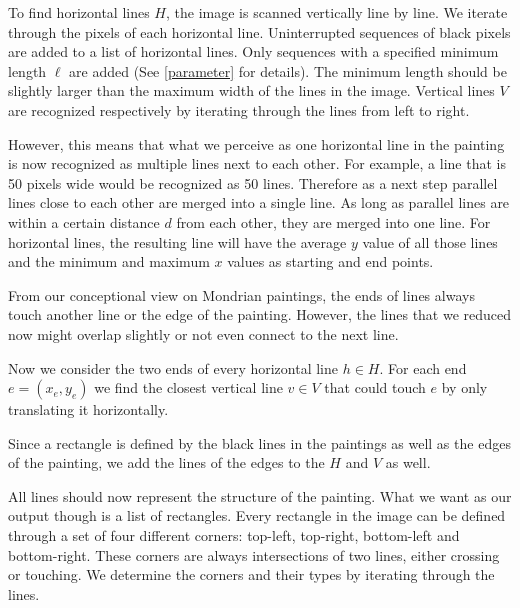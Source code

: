\documentclass[serif,article,noparskip]{agse-thesis}
\begin{document}

To find horizontal lines $H$, the image is scanned vertically line by line. We
iterate through the pixels of each horizontal line. Uninterrupted sequences of
black pixels are added to a list of horizontal lines. Only sequences with a
specified minimum length $\ell$ are added (See \ref{parameter} for details).
The minimum length should be slightly larger than the maximum width of the lines
in the image. Vertical lines $V$ are recognized respectively by iterating
through the lines from left to right.


However, this means that what we perceive as one horizontal line in the painting
is now recognized as multiple lines next to each other. For example, a line that
is 50 pixels wide would be recognized as 50 lines. Therefore as a next step
parallel lines close to each other are merged into a single line. As long as
parallel lines are within a certain distance $d$ from each other, they are merged
into one line. For horizontal lines, the resulting line will have the average
$y$ value of all those lines and the minimum and maximum $x$ values as starting
and end points.

From our conceptional view on Mondrian paintings, the ends of lines always touch
another line or the edge of the painting. However, the lines that we reduced now
might overlap slightly or not even connect to the next line.

Now we consider the two ends of every horizontal line $h \in H$. For each end $e =
(x_e,y_e)$ we find the closest vertical line $v \in V$ that could touch $e$ by only
translating it horizontally.

Since a rectangle is defined by the black lines in the paintings as well as the
edges of the painting, we add the lines of the edges to the $H$ and $V$ as well.


All lines should now represent the structure of the painting. What we want as
our output though is a list of rectangles. Every rectangle in the image can be
defined through a set of four different corners: top-left, top-right,
bottom-left and bottom-right. These corners are always intersections of two
lines, either crossing or touching. We determine the corners and their types by
iterating through the lines.
\end{document}
